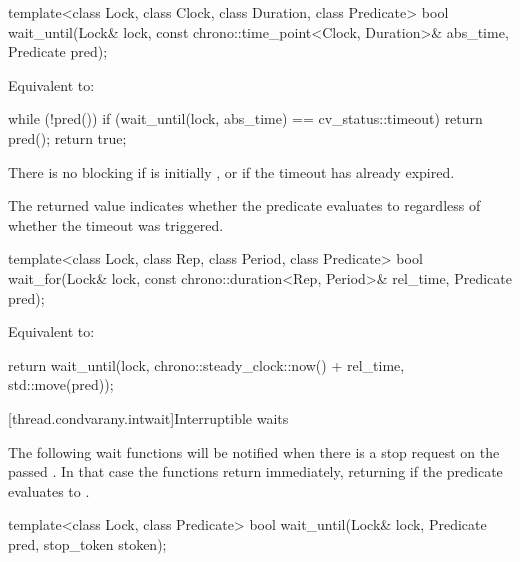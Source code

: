 %
\begin{itemdecl}
template<class Lock, class Clock, class Duration, class Predicate>
  bool wait_until(Lock& lock, const chrono::time_point<Clock, Duration>& abs_time, Predicate pred);
\end{itemdecl}

\begin{itemdescr}
\pnum
\effects Equivalent to:
\begin{codeblock}
while (!pred())
  if (wait_until(lock, abs_time) == cv_status::timeout)
    return pred();
return true;
\end{codeblock}

\pnum
\begin{note} There is no blocking if  is initially , or
if the timeout has already expired. \end{note}

\pnum
\begin{note} The returned value indicates whether the predicate evaluates to 
regardless of whether the timeout was triggered. \end{note}
\end{itemdescr}

%
\begin{itemdecl}
template<class Lock, class Rep, class Period, class Predicate>
  bool wait_for(Lock& lock, const chrono::duration<Rep, Period>& rel_time, Predicate pred);
\end{itemdecl}

\begin{itemdescr}
\pnum
\effects Equivalent to:
\begin{codeblock}
return wait_until(lock, chrono::steady_clock::now() + rel_time, std::move(pred));
\end{codeblock}
\end{itemdescr}

[thread.condvarany.intwait]{Interruptible waits}

\pnum
The following wait functions will be notified
when there is a stop request on the passed .
In that case the functions return immediately,
returning  if the predicate evaluates to .

\begin{itemdecl}
template<class Lock, class Predicate>
  bool wait_until(Lock& lock, Predicate pred, stop_token stoken);
\end{itemdecl}

